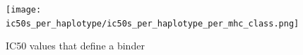 % 

\begin{figure}[!htbp]
  \texttt{[image: ic50s\_per\_haplotype/ic50s\_per\_haplotype\_per\_mhc\_class.png]}
  \caption{
    IC50 values that define a binder
  }
  \label{fig:ic50s_per_haplotype}
\end{figure}










